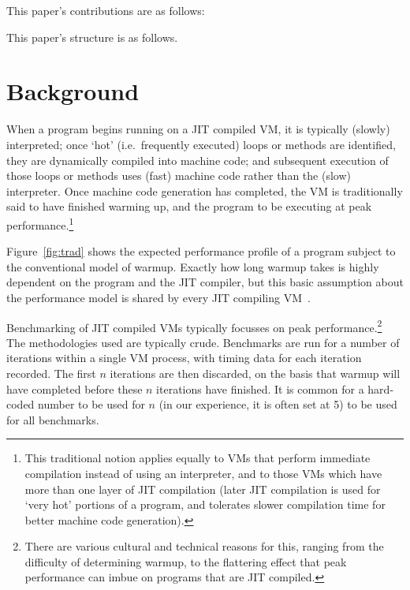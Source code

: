 \documentclass[10pt,preprint]{sigplanconf}
\begin{document}
This paper's contributions are as follows:
\begin{enumerate*}
  \item {}
\end{enumerate*}

This paper's structure is as follows. 


\section{Background}
\label{sec:warmup}

When a program begins running on a JIT compiled VM, it is typically (slowly)
interpreted; once `hot' (i.e.~frequently executed) loops or methods are
identified, they are dynamically compiled into machine code; and subsequent
execution of those loops or methods uses (fast) machine code rather than the
(slow) interpreter. Once machine code generation has completed, the VM is
traditionally said to have finished warming up, and the program to be executing
at peak performance.\footnote{This traditional notion applies equally to VMs
that perform immediate compilation instead of using an interpreter, and to
those VMs which have more than one layer of JIT compilation (later JIT
compilation is used for `very hot' portions of a program, and tolerates slower
compilation time for better machine code generation).}

Figure~\ref{fig:trad} shows the expected performance profile of a
program subject to the conventional model of warmup. Exactly how long warmup
takes is highly dependent on
the program and the JIT compiler, but this basic assumption about the
performance model is shared by every JIT compiling
VM~\cite{kalibera13rigorous}.

Benchmarking of JIT compiled VMs typically focusses on peak
performance.\footnote{There are various cultural and technical reasons for this,
ranging from the difficulty of determining warmup, to the flattering effect that
peak performance can imbue on programs that are JIT compiled.} The
methodologies used are typically crude. Benchmarks are run for a number of
iterations within a single VM process, with timing data for each iteration
recorded. The first $n$ iterations are then discarded, on the basis that warmup
will have completed before these $n$ iterations have finished. It is common for
a hard-coded number to be used for $n$ (in our experience, it is often set at 5)
to be used for all benchmarks.
\end{document}
